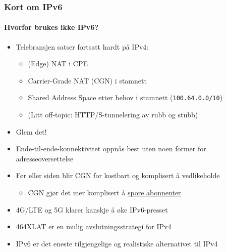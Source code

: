 \begin{frame}
  \frametitle{Kort om IPv6}
  \framesubtitle{Hvorfor brukes ikke IPv6?}
  \begin{itemize}
  \item Telebransjen satser fortsatt hardt på IPv4:
    \begin{itemize}
    \item (Edge) NAT i CPE\hfill{}
    \item Carrier-Grade NAT (CGN) i stamnett\hfill{}
    \item Shared Address Space etter behov i stamnett (\texttt{100.64.0.0/10})\hfill{}
    \item (Litt off-topic: HTTP/S-tunnelering av rubb og stubb)
    \end{itemize}
  \item Glem det!
  \item Ende-til-ende-konnektivitet oppnås best uten noen former for
    adresseoversettelse
  \item Før eller siden blir CGN for kostbart og komplisert å vedlikeholde
    \begin{itemize}
    \item CGN gjør det mer komplisert å
      \href{http://www.nyteknik.se/nyheter/it_telekom/allmant/article3904264.ece}{spore
        abonnenter}
    \end{itemize}
  \item 4G/LTE og 5G klarer kanskje å øke IPv6-presset\hfill{}
  \item 464XLAT er en mulig
    \href{https://conference.apnic.net/data/37/464xlat-apricot-2014_1393236641.pdf}{avslutningsstrategi
      for IPv4}\hfill{}
  \item \alert<2>{IPv6 er det eneste tilgjengelige og realistiske alternativet til IPv4}
  \end{itemize}
\end{frame}

